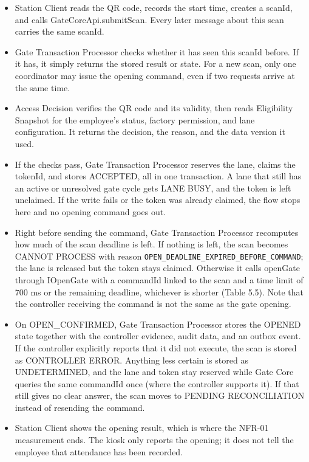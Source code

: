 \begin{itemize}[leftmargin=30pt, labelwidth=24pt, labelsep=6pt, align=left, itemsep=3pt, topsep=4pt, parsep=2pt]
  \item[\textbf{A1}] Station Client reads the QR code, records the start time, creates a scanId, and calls GateCoreApi.submitScan. Every later message about this scan carries the same scanId.
  \item[\textbf{A2}] Gate Transaction Processor checks whether it has seen this scanId before. If it has, it simply returns the stored result or state. For a new scan, only one coordinator may issue the opening command, even if two requests arrive at the same time.
  \item[\textbf{A3}] Access Decision verifies the QR code and its validity, then reads Eligibility Snapshot for the employee's status, factory permission, and lane configuration. It returns the decision, the reason, and the data version it used.
  \item[\textbf{A4}] If the checks pass, Gate Transaction Processor reserves the lane, claims the tokenId, and stores ACCEPTED, all in one transaction. A lane that still has an active or unresolved gate cycle gets LANE BUSY, and the token is left unclaimed. If the write fails or the token was already claimed, the flow stops here and no opening command goes out.
  \item[\textbf{A5}] Right before sending the command, Gate Transaction Processor recomputes how much of the scan deadline is left. If nothing is left, the scan becomes CANNOT PROCESS with reason \texttt{OPEN\_DEADLINE\_EXPIRED\_}\allowbreak\texttt{BEFORE\_COMMAND}; the lane is released but the token stays claimed. Otherwise it calls openGate through IOpenGate with a commandId linked to the scan and a time limit of 700 ms or the remaining deadline, whichever is shorter (Table 5.5). Note that the controller receiving the command is not the same as the gate opening.
  \item[\textbf{A6}] On OPEN\_CONFIRMED, Gate Transaction Processor stores the OPENED state together with the controller evidence, audit data, and an outbox event. If the controller explicitly reports that it did not execute, the scan is stored as CONTROLLER ERROR. Anything less certain is stored as UNDETERMINED, and the lane and token stay reserved while Gate Core queries the same commandId once (where the controller supports it). If that still gives no clear answer, the scan moves to PENDING RECONCILIATION instead of resending the command.
  \item[\textbf{A7}] Station Client shows the opening result, which is where the NFR-01 measurement ends. The kiosk only reports the opening; it does not tell the employee that attendance has been recorded.

\end{itemize}
